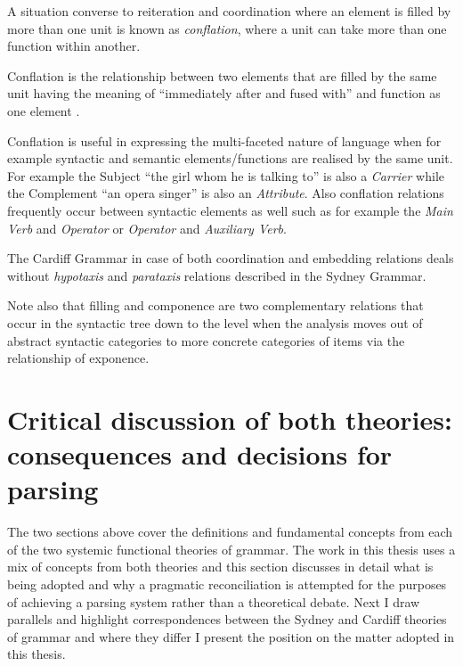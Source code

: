 A situation converse to reiteration and coordination where an element is filled by more than one unit is known as \textit{conflation}, where a unit can take more than one function within another. 

\begin{definition}[Conflation]\label{def:conflation}
    Conflation is the relationship between two elements that are filled by the same unit having the meaning of ``immediately after and fused with'' and function as one element \citep[249--250]{Fawcett2000}. 
\end{definition}

Conflation is useful in expressing the multi-faceted nature of language when for example syntactic and semantic elements/functions are realised by the same unit. For example the Subject ``the girl whom he is talking to'' is also a \textit{Carrier} while the Complement ``an opera singer'' is also an \textit{Attribute}. Also conflation relations frequently occur between syntactic elements as well such as for example the \textit{Main Verb} and \textit{Operator} or \textit{Operator} and \textit{Auxiliary Verb}.

The Cardiff Grammar in case of both coordination and embedding relations deals without \textit{hypotaxis} and \textit{parataxis} relations described in the Sydney Grammar.

%
Note also that filling and componence are two complementary relations that occur in the syntactic tree down to the level when the analysis moves out of abstract syntactic categories to more concrete categories of items via the relationship of exponence.


\section{Critical discussion of both theories: consequences and decisions for parsing} 
\label{sec:critical-on-two-theories}
The two sections above cover the definitions and fundamental concepts from each of the two systemic functional theories of grammar. The work in this thesis uses a mix of concepts from both theories and this section discusses in detail what is being adopted and why a pragmatic reconciliation is attempted for the purposes of achieving a parsing system rather than a theoretical debate. Next I draw parallels and highlight correspondences between the Sydney and Cardiff theories of grammar and where they differ I present the position on the matter adopted in this thesis.

